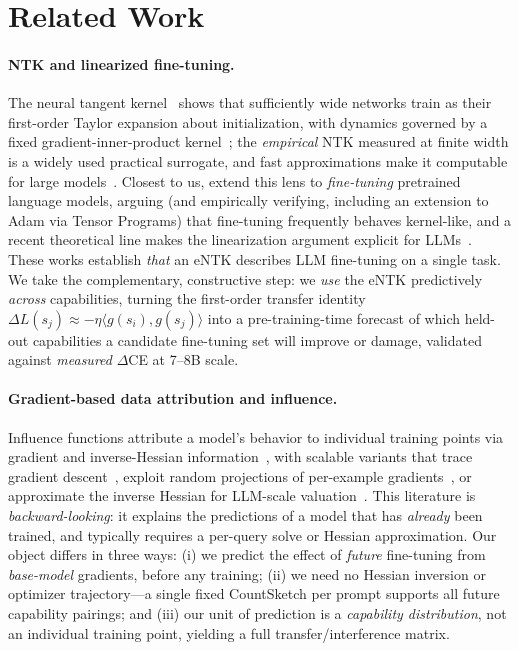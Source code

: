 \section{Related Work}
\label{sec:related}

\paragraph{NTK and linearized fine-tuning.}
The neural tangent kernel~\citep{jacot2018ntk} shows that sufficiently wide networks
train as their first-order Taylor expansion about initialization, with dynamics governed
by a fixed gradient-inner-product kernel~\citep{lee2019wide,arora2019exact}; the
\emph{empirical} NTK measured at finite width is a widely used practical surrogate,
and fast approximations make it computable for large models~\citep{novak2022fast,mohamadi2023entk,fort2020deep}.
Closest to us, \citet{malladi2023kernel} extend this lens to \emph{fine-tuning} pretrained
language models, arguing (and empirically verifying, including an extension to Adam via
Tensor Programs) that fine-tuning frequently behaves kernel-like, and a recent theoretical
line makes the linearization argument explicit for LLMs~\citep{afzal2026linearization}.
These works establish \emph{that} an eNTK describes LLM fine-tuning on a single task. We take
the complementary, constructive step: we \emph{use} the eNTK predictively \emph{across}
capabilities, turning the first-order transfer identity
$\Delta L(s_j)\approx-\eta\langle g(s_i),g(s_j)\rangle$ into a pre-training-time forecast of
which held-out capabilities a candidate fine-tuning set will improve or damage, validated
against \emph{measured} $\Delta$CE at 7--8B scale.

\paragraph{Gradient-based data attribution and influence.}
Influence functions attribute a model's behavior to individual training points via
gradient and inverse-Hessian information~\citep{koh2017influence}, with scalable variants
that trace gradient descent~\citep{pruthi2020tracin}, exploit random projections of
per-example gradients~\citep{park2023trak}, or approximate the inverse Hessian for
LLM-scale valuation~\citep{grosse2023influence,choe2024logra,kwon2024datainf,ilyas2022datamodels}.
This literature is \emph{backward-looking}: it explains the predictions of a model that has
\emph{already} been trained, and typically requires a per-query solve or Hessian
approximation. Our object differs in three ways: (i) we predict the effect of \emph{future}
fine-tuning from \emph{base-model} gradients, before any training; (ii) we need no Hessian
inversion or optimizer trajectory---a single fixed CountSketch per prompt supports all
future capability pairings; and (iii) our unit of prediction is a \emph{capability
distribution}, not an individual training point, yielding a full transfer/interference
matrix.

